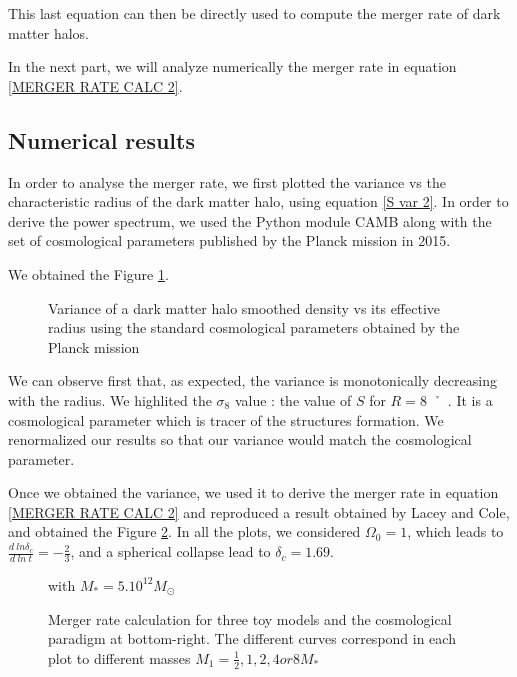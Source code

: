 This last equation can then be directly used to compute the merger rate of dark matter halos. 

In the next part, we will analyze numerically the merger rate in equation \ref{MERGER RATE CALC 2}.

\subsection{Numerical results}



In order to analyse the merger rate, we first plotted the variance vs the characteristic radius of the dark matter halo, using equation \ref{S var 2}. In order to derive the power spectrum, we used the Python module CAMB along with the set of cosmological parameters published by the Planck mission in 2015.

We obtained the Figure \ref{Variance Figure}.

\begin{figure}
\caption{Variance of a dark matter halo smoothed density vs its effective radius using the standard cosmological parameters obtained by the Planck mission}
\label{Variance Figure}
\end{figure}

We can observe first that, as expected, the variance is monotonically decreasing with the radius. We highlited the $\sigma_8$ value : the value of $S$ for $R =$\SI{8}{\per \h\mega\parsec}. It is a cosmological parameter which is tracer of the structures formation. We renormalized our results so that our variance would match the cosmological parameter.

Once we obtained the variance, we used it to derive the merger rate in equation \ref{MERGER RATE CALC 2} and reproduced a result obtained by Lacey and Cole\cite{LaC}, and obtained the Figure \ref{Merger Rate}. In all the plots, we considered $\Omega_0 = 1$, which leads to $\frac{d \ ln \delta_c}{d \ ln \ t} = -\frac{2}{3}$, and a spherical collapse lead to $\delta_c = 1.69$.

\begin{figure}
\caption{Merger rate calculation for three toy models and the cosmological paradigm at bottom-right. The different curves correspond in each plot to different masses $M_1 = \frac{1}{2}, 1, 2, 4 or 8 M_\ast$} with $M_\ast = 5.10^{12} M_\odot$
\label{Merger Rate}
\end{figure}


